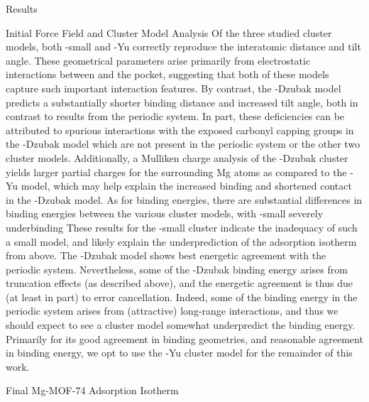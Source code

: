 \begin{section}{Results}
\begin{subsection}{Initial Force Field and Cluster Model Analysis}
Of the three studied cluster models, both \mgmof-small and \mgmof-Yu correctly
reproduce the  interatomic distance and  tilt angle. These
geometrical parameters arise primarily from electrostatic interactions between
\co and the  pocket,\cite{Valenzano2010} 
suggesting that both of these models capture such important interaction
features. By contrast, the \mgmof-Dzubak model predicts a substantially shorter binding
distance and increased tilt angle, both in contrast to results from the
periodic system. In part, these deficiencies can be attributed to spurious
\co interactions with the exposed carbonyl capping groups in the \mgmof-Dzubak
model which are not present in the periodic system or the other two cluster
models. Additionally, a Mulliken charge analysis of the 
\mgmof-Dzubak cluster yields larger partial charges for the surrounding Mg
atoms as compared to the \mgmof-Yu model, which may help explain the increased
binding and shortened  contact in the \mgmof-Dzubak model. 
As for binding energies, there are substantial differences in binding energies
between the various cluster models, with \mgmof-small severely underbinding
These results for the \mgmof-small cluster indicate the inadequacy of such a small 
model, and likely explain the underprediction of the \co adsorption isotherm
from above. 
The \mgmof-Dzubak model shows best energetic agreement with the periodic system. 
Nevertheless, some of the \mgmof-Dzubak binding energy arises from 
truncation effects (as described above), and the energetic agreement is thus
due (at least in part) to error cancellation. Indeed, some of the binding
energy in the periodic system arises from (attractive) long-range
interactions, and thus we should expect to see a cluster model somewhat
underpredict the binding energy. 
Primarily for its good agreement in binding geometries, and reasonable
agreement in binding energy, 
we opt to use the \mgmof-Yu cluster model for the remainder of this work.

\end{subsection}
\begin{subsection}{Final Mg-MOF-74 {\co} Adsorption Isotherm}


\end{subsection}
\end{section}
